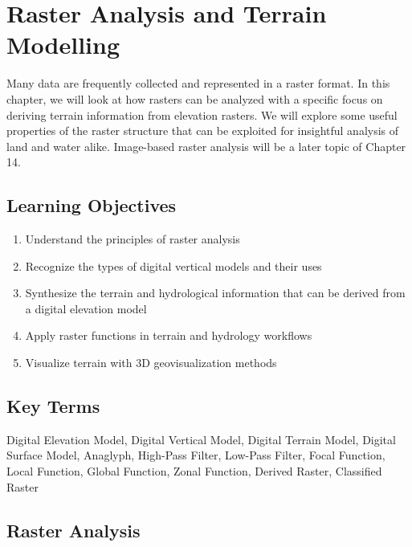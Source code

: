 \documentclass[
]{book}
\providecommand{\tightlist}{%
  \setlength{\itemsep}{0pt}\setlength{\parskip}{0pt}}
\begin{document}
\hypertarget{raster-analysis-and-terrain-modelling}{%
\chapter{Raster Analysis and Terrain Modelling}\label{raster-analysis-and-terrain-modelling}}

Many data are frequently collected and represented in a raster format. In this chapter, we will look at how rasters can be analyzed with a specific focus on deriving terrain information from elevation rasters. We will explore some useful properties of the raster structure that can be exploited for insightful analysis of land and water alike. Image-based raster analysis will be a later topic of Chapter 14.

\hypertarget{learning-objectives-8}{%
\section*{Learning Objectives}\label{learning-objectives-8}}

\begin{enumerate}
\def\labelenumi{\arabic{enumi}.}
\tightlist
\item
  Understand the principles of raster analysis
\item
  Recognize the types of digital vertical models and their uses
\item
  Synthesize the terrain and hydrological information that can be derived from a digital elevation model
\item
  Apply raster functions in terrain and hydrology workflows
\item
  Visualize terrain with 3D geovisualization methods
\end{enumerate}

\hypertarget{key-terms-8}{%
\section*{Key Terms}\label{key-terms-8}}

Digital Elevation Model, Digital Vertical Model, Digital Terrain Model, Digital Surface Model, Anaglyph, High-Pass Filter, Low-Pass Filter, Focal Function, Local Function, Global Function, Zonal Function, Derived Raster, Classified Raster

\hypertarget{raster-analysis}{%
\section{Raster Analysis}\label{raster-analysis}}
\end{document}
